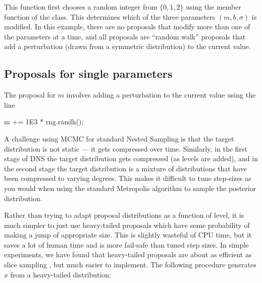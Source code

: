 \documentclass[article, nojss]{jss}
\begin{document}
This function first chooses a random integer from $\{0, 1, 2\}$ using the
 member function of the  class.
This determines which of the three parameters
$(m, b, \sigma)$ is modified. In this example, there are no proposals
that modify more than one of the parameters at a time, and all proposals
are ``random walk'' proposals that add a perturbation
(drawn from a symmetric distribution) to the current value.

\subsection{Proposals for single parameters}\label{sec:proposals}
The proposal for $m$ involves adding a perturbation to the current
value using the line

\begin{CodeChunk}
\begin{CodeInput}
m += 1E3 * rng.randh();
\end{CodeInput}
\end{CodeChunk}

A challenge using MCMC for standard Nested Sampling is that the target
distribution is not static --- it gets compressed over time. Similarly, in
the first stage of DNS the target distribution gets compressed (as levels are
added), and in the second stage the target distribution is a mixture of
distributions that have been compressed to varying degrees.
This makes it difficult to tune step-sizes as you would when using
the standard Metropolis algorithm to sample the posterior distribution.

Rather than trying to adapt proposal distributions as a function of level,
it is much simpler to just use heavy-tailed proposals which have some
probability of making a jump of appropriate size. This is slightly
wasteful of CPU time, but it saves a lot of human time and is more
fail-safe than tuned step sizes.
In simple experiments, we have found that heavy-tailed proposals are
about as efficient as slice sampling \citep{neal2003slice}, but much easier to
implement. The following procedure generates
$x$ from a heavy-tailed distribution:
\end{document}
